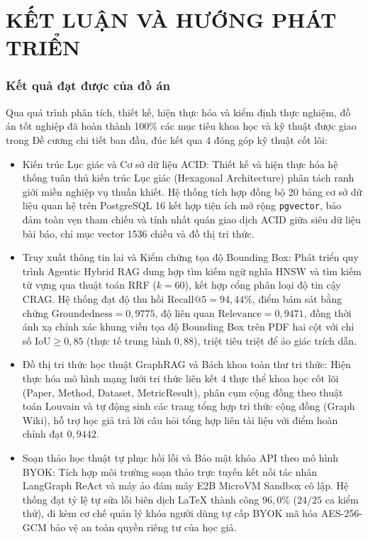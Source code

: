 \cleardoublepage
{}
\chapter*{KẾT LUẬN VÀ HƯỚNG PHÁT TRIỂN}

\subsection*{Kết quả đạt được của đồ án}
Qua quá trình phân tích, thiết kế, hiện thực hóa và kiểm định thực nghiệm, đồ án tốt nghiệp đã hoàn thành 100\% các mục tiêu khoa học và kỹ thuật được giao trong Đề cương chi tiết ban đầu, đúc kết qua 4 đóng góp kỹ thuật cốt lõi:
\begin{itemize}
    \item Kiến trúc Lục giác và Cơ sở dữ liệu ACID: Thiết kế và hiện thực hóa hệ thống \VS tuân thủ kiến trúc Lục giác (Hexagonal Architecture) phân tách ranh giới miền nghiệp vụ thuần khiết. Hệ thống tích hợp đồng bộ 20 bảng cơ sở dữ liệu quan hệ trên PostgreSQL 16 kết hợp tiện ích mở rộng \texttt{pgvector}, bảo đảm toàn vẹn tham chiếu và tính nhất quán giao dịch ACID giữa siêu dữ liệu bài báo, chỉ mục vector 1536 chiều và đồ thị tri thức.
    \item Truy xuất thông tin lai và Kiểm chứng tọa độ Bounding Box: Phát triển quy trình Agentic Hybrid RAG dung hợp tìm kiếm ngữ nghĩa HNSW và tìm kiếm từ vựng qua thuật toán RRF ($k=60$), kết hợp cổng phân loại độ tin cậy CRAG. Hệ thống đạt độ thu hồi $\text{Recall@5} = 94{,}44\%$, điểm bám sát bằng chứng $\text{Groundedness} = 0{,}9775$, độ liên quan $\text{Relevance} = 0{,}9471$, đồng thời ánh xạ chính xác khung viền tọa độ Bounding Box trên PDF hai cột với chỉ số $\text{IoU} \ge 0{,}85$ (thực tế trung bình $0{,}88$), triệt tiêu triệt để ảo giác trích dẫn.
    \item Đồ thị tri thức học thuật GraphRAG và Bách khoa toàn thư tri thức: Hiện thực hóa mô hình mạng lưới tri thức liên kết 4 thực thể khoa học cốt lõi (Paper, Method, Dataset, MetricResult), phân cụm cộng đồng theo thuật toán Louvain và tự động sinh các trang tổng hợp tri thức cộng đồng (Graph Wiki), hỗ trợ học giả trả lời câu hỏi tổng hợp liên tài liệu với điểm hoàn chỉnh đạt $0{,}9442$.
    \item Soạn thảo học thuật tự phục hồi lỗi và Bảo mật khóa API theo mô hình BYOK: Tích hợp môi trường soạn thảo trực tuyến kết nối tác nhân LangGraph ReAct và máy ảo đám mây E2B MicroVM Sandbox cô lập. Hệ thống đạt tỷ lệ tự sửa lỗi biên dịch LaTeX thành công $96{,}0\%$ ($24/25$ ca kiểm thử), đi kèm cơ chế quản lý khóa người dùng tự cấp BYOK mã hóa AES-256-GCM bảo vệ an toàn quyền riêng tư của học giả.
\end{itemize}

